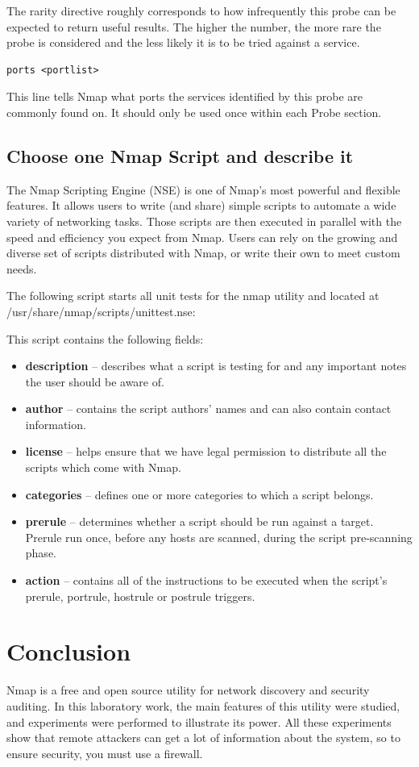 \documentclass[14pt,a4paper,report]{report}
\begin{document}
The rarity directive roughly corresponds to how infrequently this probe can be expected to return useful results. The higher the number, the more rare the probe is considered and the less likely it is to be tried against a service.

\begin{verbatim}
ports <portlist>
\end{verbatim}

This line tells Nmap what ports the services identified by this probe are commonly found on. It should only be used once within each Probe section.

\subsection{Choose one Nmap Script and describe it}

The Nmap Scripting Engine (NSE) is one of Nmap's most powerful and flexible features. It allows users to write (and share) simple scripts to automate a wide variety of networking tasks. Those scripts are then executed in parallel with the speed and efficiency you expect from Nmap. Users can rely on the growing and diverse set of scripts distributed with Nmap, or write their own to meet custom needs.

The following script starts all unit tests for the nmap utility and located at /usr/share/nmap/scripts/unittest.nse:



This script contains the following fields:

\begin{itemize}
	\item \textbf{description} -- describes what a script is testing for and any important notes the user should be aware of.
	\item \textbf{author} -- contains the script authors' names and can also contain contact information.
	\item \textbf{license} -- helps ensure that we have legal permission to distribute all the scripts which come with Nmap.
	\item \textbf{categories} -- defines one or more categories to which a script belongs.
	\item \textbf{prerule} -- determines whether a script should be run against a target. Prerule run once, before any hosts are scanned, during the script pre-scanning phase.
	\item \textbf{action} -- contains all of the instructions to be executed when the script's prerule, portrule, hostrule or postrule triggers.
\end{itemize}

\section{Conclusion}

Nmap is a free and open source utility for network discovery and security auditing. In this laboratory work, the main features of this utility were studied, and experiments were performed to illustrate its power. All these experiments show that remote attackers can get a lot of information about the system, so to ensure security, you must use a firewall.
\end{document}
